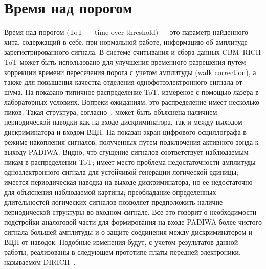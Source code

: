 \section{Время над порогом}\label{section:secToT}

Время над порогом (ToT --- time over threshold) --- это параметр найденного хита, содержащий в себе, при нормальной работе, информацию об амплитуде зарегистрированного сигнала. В системе считывания и сбора данных CBM~RICH ToT может быть использовано для улучшения временного разрешения путём коррекции времени пересечения порога с учетом амплитуды (walk correction), а также для повышения качества отделения однофотоэлектронного сигнала от шума. На  показано типичное распределение ToT, измереное с помощью лазера в лабораторных условиях. Вопреки ожиданиям, это распределение имеет несколько пиков. Такая структура, согласно~\cite{ToTinNoise}, может быть объяснена наличием периодической наводки как на входе дискриминатора, так и между выходом дискриминатора и входом ВЦП. На  показан экран цифрового осциллографа в режиме накопления сигналов, полученных путем подключения активного зонда к выходу PADIWA. Видно, что сгущение сигналов соответствует наблюдаемым пикам в распределении ToT; имеет место проблема недостаточности амплитуды одноэлектронного сигнала для устойчивой генерации логической единицы; имеется периодическая наводка на выходе дискриминатора, но ее недостаточно для объяснения наблюдаемой картины; преобладание определенных длительностей логических сигналов позволяет предположить наличие периодической структуры во входном сигнале. Все это говорит о необходимости подстройки аналоговой части для формирования на входе PADIWA более чистого сигнала большей амплитуды и о защите соединения между дискриминатором и ВЦП от наводок. Подобные изменения будут, с учетом результатов данной работы, реализованы в следующем прототипе платы передней электроники, называемом DIRICH~\cite{DIRICH}.

